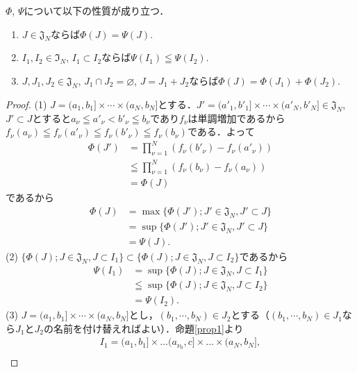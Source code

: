 \documentclass[12pt,a4paper]{jsarticle}
\newcommand{\frakI}{\mathfrak{I}}
\newcommand{\frakJ}{\mathfrak{J}}
\begin{document}
\begin{proposition}\label{prop2}
    $\Phi$, $\Psi$について以下の性質が成り立つ．
    \begin{enumerate}
        \item $J \in \frakJ_N$ならば$\Phi(J) = \Psi(J)$.
        \item $I_1, I_2 \in \frakI_N$, $I_1 \subset I_2$ならば$\Psi(I_1) \leqq \Psi(I_2)$.
        \item $J, J_1, J_2 \in \frakJ_N$, $J_1 \cap J_2 = \varnothing$, $J = J_1 + J_2$ならば$\Phi(J) = \Phi(J_1) + \Phi(J_2)$.
    \end{enumerate}
\end{proposition}
\begin{proof}
    (1) $J = (a_1, b_1] \times \cdots \times (a_N, b_N]$とする．$J' = (a'_1, b'_1] \times \cdots \times (a'_N, b'_N] \in \frakJ_N$, $J' \subset J$とすると$a_\nu \leqq a'_\nu < b'_\nu \leqq b_\nu$であり$f_\nu$は単調増加であるから$f_\nu(a_\nu) \leqq f_\nu(a'_\nu) \leqq f_\nu(b'_\nu) \leqq f_\nu(b_\nu)$である．よって
    \begin{align*}
        \Phi(J')
        &= \prod_{\nu = 1}^N (f_\nu(b'_\nu) - f_\nu(a'_\nu)) \\
        &\leqq \prod_{\nu = 1}^N (f_\nu(b_\nu) - f_\nu(a_\nu)) \\
        &= \Phi(J)
    \end{align*}
    であるから
    \begin{align*}
        \Phi(J)
        &= \max\{\Phi(J') ; J' \in \frakJ_N, J' \subset J\} \\
        &= \sup\{\Phi(J') ; J' \in \frakJ_N, J' \subset J\} \\
        &= \Psi(J).
    \end{align*}
    (2) $\{\Phi(J) ; J \in \frakJ_N, J \subset I_1\} \subset \{\Phi(J) ; J \in \frakJ_N, J \subset I_2\}$であるから
    \begin{align*}
        \Psi(I_1)
        &= \sup\{\Phi(J) ; J \in \frakJ_N, J \subset I_1\} \\
        &\leqq \sup\{\Phi(J) ; J \in \frakJ_N, J \subset I_2\} \\
        &= \Psi(I_2).
    \end{align*}
    (3) $J = (a_1, b_1] \times \cdots \times (a_N, b_N]$とし，$(b_1, \cdots, b_N) \in J_2$とする（$(b_1, \cdots, b_N) \in J_1$なら$J_1$と$J_2$の名前を付け替えればよい）．命題\ref{prop1}より
    \begin{gather*}
    I_1 = (a_1, b_1] \times \dots (a_{\nu_0}, c] \times \dots \times (a_N, b_N], \\

\end{gather*}
\end{proof}
\end{document}
